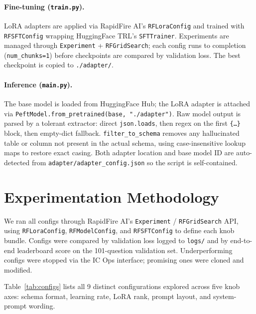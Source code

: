 \documentclass[11pt]{article}
\begin{document}
\paragraph{Fine-tuning (\texttt{train.py}).}
LoRA adapters are applied via RapidFire AI's \texttt{RFLoraConfig} and trained with
\texttt{RFSFTConfig} wrapping HuggingFace TRL's \texttt{SFTTrainer}.  Experiments are
managed through \texttt{Experiment} + \texttt{RFGridSearch}; each config runs to completion
(\texttt{num\_chunks=1}) before checkpoints are compared by validation loss.  The best
checkpoint is copied to \texttt{./adapter/}.

\paragraph{Inference (\texttt{main.py}).}
The base model is loaded from HuggingFace Hub; the LoRA adapter is attached via
\texttt{PeftModel.from\_pretrained(base, "./adapter")}.  Raw model output is parsed by a
tolerant extractor: direct \texttt{json.loads}, then regex on the first \texttt{\{\ldots\}}
block, then empty-dict fallback.  \texttt{filter\_to\_schema} removes any hallucinated
table or column not present in the actual schema, using case-insensitive lookup maps to
restore exact casing.  Both adapter location and base model ID are auto-detected from
\texttt{adapter/adapter\_config.json} so the script is self-contained.

\section{Experimentation Methodology}
\label{sec:exp}

We ran all configs through RapidFire AI's \texttt{Experiment} / \texttt{RFGridSearch} API,
using \texttt{RFLoraConfig}, \texttt{RFModelConfig}, and \texttt{RFSFTConfig} to define each
knob bundle.  Configs were compared by validation loss logged to \texttt{logs/} and by
end-to-end leaderboard score on the 101-question validation set.  Underperforming configs were
stopped via the IC Ops interface; promising ones were cloned and modified.

Table~\ref{tab:configs} lists all 9 distinct configurations explored across five knob axes:
schema format, learning rate, LoRA rank, prompt layout, and system-prompt wording.
\end{document}
